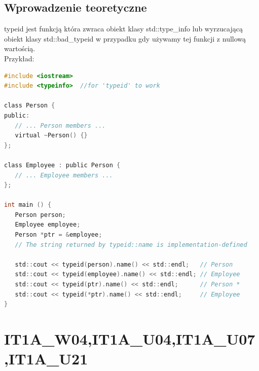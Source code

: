 \subsection{Wprowadzenie teoretyczne}
typeid jest funkcją która zwraca obiekt klasy std::type\_info lub wyrzucającą obiekt klasy std::bad\_typeid w przypadku gdy używamy tej funkcji z nullową wartością.\\
Przykład:
\begin{lstlisting}[language=c]
#include <iostream>
#include <typeinfo>  //for 'typeid' to work

class Person {
public:
   // ... Person members ...
   virtual ~Person() {}
};

class Employee : public Person {
   // ... Employee members ...
};

int main () {
   Person person;
   Employee employee;
   Person *ptr = &employee;
   // The string returned by typeid::name is implementation-defined
   
   std::cout << typeid(person).name() << std::endl;   // Person
   std::cout << typeid(employee).name() << std::endl; // Employee
   std::cout << typeid(ptr).name() << std::endl;      // Person * 
   std::cout << typeid(*ptr).name() << std::endl;     // Employee
}
\end{lstlisting}


\section{IT1A\_W04,IT1A\_U04,IT1A\_U07,IT1A\_U21}

